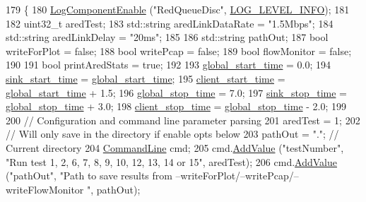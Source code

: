 \begin{DoxyCode}
179 \{
180   \hyperlink{namespacens3_adc4ef4f00bb2f5f4edae67fc3bc27f20}{LogComponentEnable} (\textcolor{stringliteral}{"RedQueueDisc"}, \hyperlink{namespacens3_aa6464a4d69551a9cc968e17a65f39bdbae36aedc880de94fd5a5b53bb9fe65628}{LOG\_LEVEL\_INFO});
181 
182   uint32\_t aredTest;
183   std::string aredLinkDataRate = \textcolor{stringliteral}{"1.5Mbps"};
184   std::string aredLinkDelay = \textcolor{stringliteral}{"20ms"};
185 
186   std::string pathOut;
187   \textcolor{keywordtype}{bool} writeForPlot = \textcolor{keyword}{false};
188   \textcolor{keywordtype}{bool} writePcap = \textcolor{keyword}{false};
189   \textcolor{keywordtype}{bool} flowMonitor = \textcolor{keyword}{false};
190 
191   \textcolor{keywordtype}{bool} printAredStats = \textcolor{keyword}{true};
192 
193   \hyperlink{adaptive-red-tests_8cc_ab3a0ca969f11332a6b4ca8bc81e19ba7}{global\_start\_time} = 0.0;
194   \hyperlink{adaptive-red-tests_8cc_a2c56dc9b543a4442a7edd8d680c4a1bc}{sink\_start\_time} = \hyperlink{adaptive-red-tests_8cc_ab3a0ca969f11332a6b4ca8bc81e19ba7}{global\_start\_time};
195   \hyperlink{adaptive-red-tests_8cc_a18ff86acaf663200fbedb1f77d03b515}{client\_start\_time} = \hyperlink{adaptive-red-tests_8cc_ab3a0ca969f11332a6b4ca8bc81e19ba7}{global\_start\_time} + 1.5;
196   \hyperlink{adaptive-red-tests_8cc_a374328526043935f11841a7ec7e396d5}{global\_stop\_time} = 7.0;
197   \hyperlink{adaptive-red-tests_8cc_a2462eef540f5b896f14d4ea7b7bb6214}{sink\_stop\_time} = \hyperlink{adaptive-red-tests_8cc_a374328526043935f11841a7ec7e396d5}{global\_stop\_time} + 3.0;
198   \hyperlink{adaptive-red-tests_8cc_aee714f5dcf74da2f73bcdd66c8a9e265}{client\_stop\_time} = \hyperlink{adaptive-red-tests_8cc_a374328526043935f11841a7ec7e396d5}{global\_stop\_time} - 2.0;
199 
200   \textcolor{comment}{// Configuration and command line parameter parsing}
201   aredTest = 1;
202   \textcolor{comment}{// Will only save in the directory if enable opts below}
203   pathOut = \textcolor{stringliteral}{"."}; \textcolor{comment}{// Current directory}
204   \hyperlink{classns3_1_1CommandLine}{CommandLine} cmd;
205   cmd.\hyperlink{classns3_1_1CommandLine_addcfb546c7ad4c8bd0965654d55beb8e}{AddValue} (\textcolor{stringliteral}{"testNumber"}, \textcolor{stringliteral}{"Run test 1, 2, 6, 7, 8, 9, 10, 12, 13, 14 or 15"}, aredTest);
206   cmd.\hyperlink{classns3_1_1CommandLine_addcfb546c7ad4c8bd0965654d55beb8e}{AddValue} (\textcolor{stringliteral}{"pathOut"}, \textcolor{stringliteral}{"Path to save results from --writeForPlot/--writePcap/--writeFlowMonitor
      "}, pathOut);

\end{DoxyCode}
